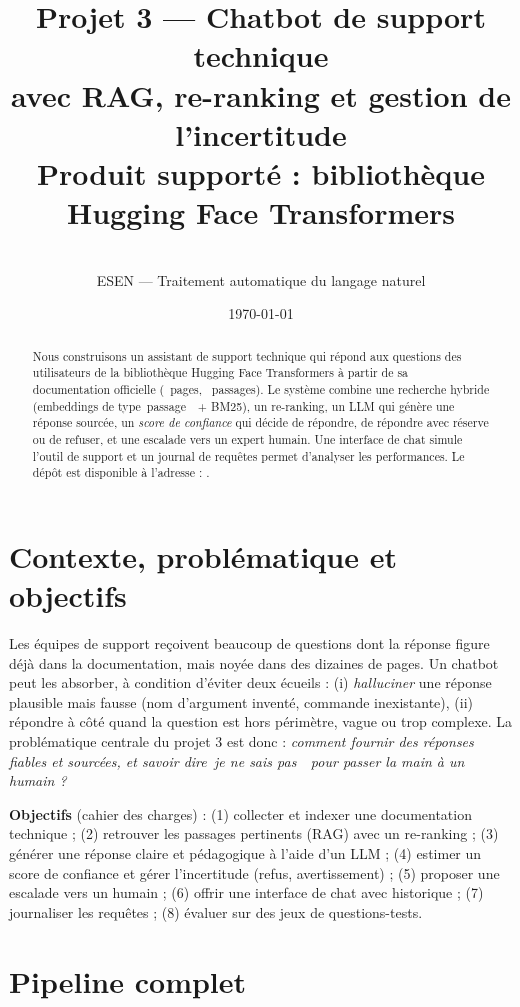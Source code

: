 \documentclass[11pt,a4paper]{article}
\title{\textbf{Projet 3 --- Chatbot de support technique\\avec RAG, re-ranking et gestion de l'incertitude}\\[2pt]\large Produit support\'e : biblioth\`eque Hugging Face Transformers}
\author{\\ ESEN --- Traitement automatique du langage naturel}
\date{\today}
\providecommand{\og}{\guillemotleft\,}\providecommand{\fg}{\,\guillemotright}
\begin{document}
\maketitle
\begin{abstract}
Nous construisons un assistant de support technique qui r\'epond aux questions des utilisateurs de la biblioth\`eque Hugging Face Transformers \`a partir de sa documentation officielle (\NDocs\ pages, \NChunks\ passages). Le syst\`eme combine une recherche hybride (embeddings de type \og passage \fg\ + BM25), un re-ranking, un LLM qui g\'en\`ere une r\'eponse sourc\'ee, un \emph{score de confiance} qui d\'ecide de r\'epondre, de r\'epondre avec r\'eserve ou de refuser, et une escalade vers un expert humain. Une interface de chat simule l'outil de support et un journal de requ\^etes permet d'analyser les performances. Le d\'epôt est disponible \`a l'adresse : \href{\RepoURL}{\texttt{\RepoURL}}.
\end{abstract}
\tableofcontents
\newpage

\section{Contexte, probl\'ematique et objectifs}
Les \'equipes de support re\c coivent beaucoup de questions dont la r\'eponse figure d\'ej\`a dans la documentation, mais noy\'ee dans des dizaines de pages. Un chatbot peut les absorber, \`a condition d'\'eviter deux \'ecueils : (i) \emph{halluciner} une r\'eponse plausible mais fausse (nom d'argument invent\'e, commande inexistante), (ii) r\'epondre \`a c\^ot\'e quand la question est hors p\'erim\`etre, vague ou trop complexe. La probl\'ematique centrale du projet 3 est donc : \emph{comment fournir des r\'eponses fiables et sourc\'ees, et savoir dire \og je ne sais pas \fg\ pour passer la main \`a un humain ?}

\textbf{Objectifs} (cahier des charges) : (1) collecter et indexer une documentation technique ; (2) retrouver les passages pertinents (RAG) avec un re-ranking ; (3) g\'en\'erer une r\'eponse claire et p\'edagogique \`a l'aide d'un LLM ; (4) estimer un score de confiance et g\'erer l'incertitude (refus, avertissement) ; (5) proposer une escalade vers un humain ; (6) offrir une interface de chat avec historique ; (7) journaliser les requ\^etes ; (8) \'evaluer sur des jeux de questions-tests.

\section{Pipeline complet}
\end{document}
